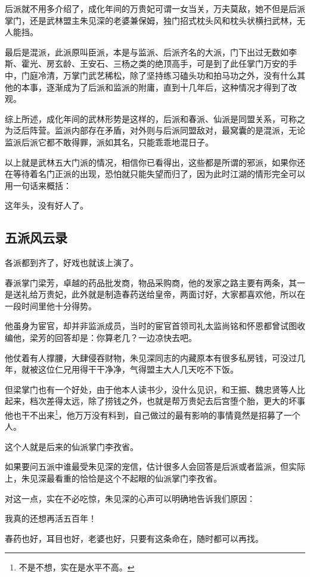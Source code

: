 \begin{multicols}{\theparacolNo}
后派就不用多介绍了，成化年间的万贵妃可谓一女当关，万夫莫敌，她不但是后派掌门，还是武林盟主朱见深的老婆兼保姆，独门招式枕头风和枕头状横扫武林，无人能挡。

最后是混派，此派原叫臣派，本是与监派、后派齐名的大派，门下出过无数如李斯、霍光、房玄龄、王安石、三杨之类的绝顶高手，可是到了此任掌门万安的手中，门庭冷清，万掌门武艺稀松，除了坚持练习磕头功和拍马功之外，没有什么其他的本事，逐渐成为了后派和监派的附庸，直到十几年后，这种情况才得到了改观。

综上所述，成化年间的武林形势是这样的，后派和春派、仙派是同盟关系，可称之为泛后阵营。监派内部存在矛盾，对外则与后派同盟敌对，最窝囊的是混派，无论监派后派它都不敢得罪，派如其名，只能乖乖地混日子。

以上就是武林五大门派的情况，相信你已看得出，这些都是所谓的邪派，如果你还在等待着名门正派的出现，恐怕就只能失望而归了，因为此时江湖的情形完全可以用一句话来概括：

这年头，没有好人了。

\subsection{五派风云录}
各派都到齐了，好戏也就该上演了。

春派掌门梁芳，卓越的药品批发商，物品采购商，他的发家之路主要有两条，其一是送礼给万贵妃，此外就是制造春药送给皇帝，两面讨好，大家都喜欢他，所以在一段时间里他十分得势。

他虽身为宦官，却并非监派成员，当时的宦官首领司礼太监尚铭和怀恩都曾试图收编他，梁芳的回答却是：你算老几？一边凉快去吧。

他仗着有人撑腰，大肆侵吞财物，朱见深同志的内藏原本有很多私房钱，可没过几年，就被这位仁兄用得干干净净，气得盟主大人几天吃不下饭。

但梁掌门也有一个好处，由于他本人读书少，没什么见识，和王振、魏忠贤等人比起来，档次差得太远，除了捞钱之外，也就是帮万贵妃去后宫堕个胎，更大的坏事他也干不出来\footnote{不是不想，实在是水平不高。}，他万万没有料到，自己做过的最有影响的事情竟然是招募了一个人。

这个人就是后来的仙派掌门李孜省。

如果要问五派中谁最受朱见深的宠信，估计很多人会回答是后派或者监派，但实际上，朱见深最看重的恰恰是这个不起眼的仙派掌门李孜省。

对这一点，实在不必吃惊，朱见深的心声可以明确地告诉我们原因：

我真的还想再活五百年！

春药也好，耳目也好，老婆也好，只要有这条命在，随时都可以再找。


\end{multicols}
